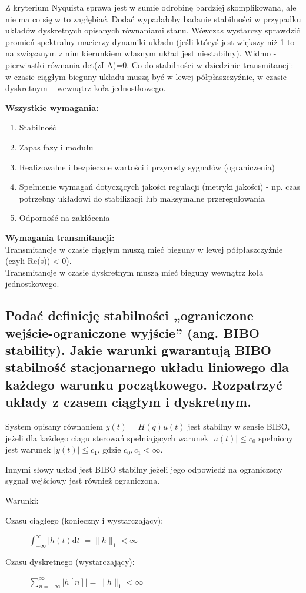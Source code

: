 Z kryterium Nyquista sprawa jest w sumie odrobinę bardziej skomplikowana, ale nie ma co się w to zagłębiać. Dodać wypadałoby badanie stabilności w przypadku układów dyskretnych opisanych równaniami stanu. Wówczas wystarczy sprawdzić promień spektralny macierzy dynamiki układu (jeśli któryś jest większy niż 1 to na związanym z nim kierunkiem własnym układ jest niestabilny). Widmo - pierwiastki równania det(zI-A)=0. Co do stabilności w dziedzinie transmitancji: w czasie ciągłym bieguny układu muszą być w lewej półpłaszczyźnie, w czasie dyskretnym – wewnątrz koła jednostkowego.

\textbf{Wszystkie wymagania:}
\begin{enumerate}
    \item Stabilność
    \item Zapas fazy i modułu
    \item Realizowalne i bezpieczne wartości i przyrosty sygnałów (ograniczenia)
    \item Spełnienie wymagań dotyczących jakości regulacji (metryki jakości) - np. czas potrzebny układowi do stabilizacji lub maksymalne przeregulowania
    \item Odporność na zakłócenia
\end{enumerate}

\textbf{Wymagania transmitancji:}\\
Transmitancje w czasie ciągłym muszą mieć bieguny w lewej półpłaszczyźnie (czyli Re(s)) < 0).\\
Transmitancje w czasie dyskretnym muszą mieć bieguny wewnątrz koła jednostkowego.


\subsection{Podać definicję stabilności „ograniczone wejście-ograniczone wyjście” (ang. BIBO stability). Jakie warunki gwarantują BIBO stabilność stacjonarnego układu liniowego dla każdego warunku początkowego. Rozpatrzyć układy z czasem ciągłym i dyskretnym.}

System opisany równaniem $y(t)=H(q)u(t)$ jest stabilny w sensie BIBO, jeżeli dla każdego ciagu sterowań spełniających warunek $|u(t)|\leq c_0$ spełniony jest warunek $|y(t)|\leq c_1$, gdzie $c_0,c_1<\infty$.

Innymi słowy układ jest BIBO stabilny jeżeli jego odpowiedź na ograniczony sygnał wejściowy jest również ograniczona.

Warunki:
\begin{description}
    \item[Czasu ciągłego (konieczny i wystarczający):] $\int_{-\infty}^\infty |h(t)\mathrm{d}t|=\|h\|_1<\infty$
    \item[Czasu dyskretnego (wystarczający):] $\sum_{n=-\infty}^\infty |h[n]| = \|h\|_1<\infty$
\end{description}


